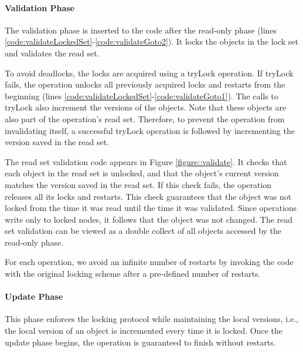 
\paragraph{Validation Phase} 
The validation phase is inserted to the code after
the read-only phase (lines
\ref{code:validateLockedSet}-\ref{code:validateGoto2}). 
It locks the objects in the lock set and validates the read set. 

To avoid deadlocks, the locks are acquired using a tryLock
operation. If tryLock fails, the operation unlocks  all
previously acquired locks and restarts from the beginning 
(lines \ref{code:validateLockedSet}-\ref{code:validateGoto1}). 
The calls to tryLock also increment the versions 
of the objects. Note that these objects are also part of the 
operation's read set. Therefore, to prevent the operation from invalidating itself, 
a successful tryLock operation is followed by incrementing
the version saved in the read set.  

The read set validation code appears in Figure \ref{figure::validate}. 
It checks that each object in the read set is unlocked, 
and that the object's current version matches the version saved in the 
read set. If this check fails, the operation releases all its
locks and restarts. This check guarantees
that the object was not locked from the time it was read until
the time it was validated. Since operations write only to
locked nodes, it follows that the object was not changed.  
The read set validation can be viewed as a double collect 
of all objects accessed by the read-only phase. 

For each operation, we avoid an infinite number of restarts by invoking the code
with the original locking scheme after a pre-defined number of restarts.  



  
\paragraph{Update Phase} 
This phase enforces the locking protocol
  while maintaining the local versions, i.e., the local version of 
  an object is incremented every time it is locked.  
  Once the update phase begins, the operation is guaranteed to 
  finish without restarts.  


